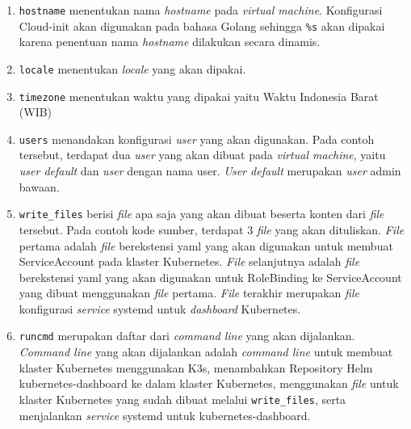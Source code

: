 \begin{enumerate}
  
  \item \lstinline{hostname} menentukan nama \emph{hostname} pada \emph{virtual machine}.
    Konfigurasi Cloud-init akan digunakan pada bahasa Golang sehingga \lstinline{%s}
    akan dipakai karena penentuan nama \emph{hostname} dilakukan secara dinamis.

  \item \lstinline{locale} menentukan \emph{locale} yang akan dipakai.

  \item \lstinline{timezone} menentukan waktu yang dipakai yaitu Waktu Indonesia Barat (WIB)

  \item \lstinline{users} menandakan konfigurasi \emph{user} yang akan digunakan. Pada
    contoh tersebut, terdapat dua \emph{user} yang akan dibuat pada \emph{virtual machine},
    yaitu \emph{user default} dan \emph{user} dengan nama user. \emph{User default} merupakan
    \emph{user} admin bawaan.

  \item \lstinline{write_files} berisi \emph{file} apa saja yang akan dibuat beserta konten
    dari \emph{file} tersebut. Pada contoh kode sumber, terdapat 3 \emph{file} yang akan dituliskan.
    \emph{File} pertama adalah \emph{file} berekstensi yaml yang akan digunakan untuk membuat
    ServiceAccount pada klaster Kubernetes. \emph{File} selanjutnya adalah \emph{file} berekstensi
    yaml yang akan digunakan untuk RoleBinding ke ServiceAccount yang dibuat menggunakan
    \emph{file} pertama. \emph{File} terakhir merupakan \emph{file} konfigurasi 
    \emph{service} systemd untuk \emph{dashboard} Kubernetes.

  \item \lstinline{runcmd} merupakan daftar dari \emph{command line} yang akan dijalankan.
    \emph{Command line} yang akan dijalankan adalah \emph{command line} untuk membuat klaster
    Kubernetes menggunakan K3s, menambahkan Repository Helm kubernetes-dashboard ke dalam
    klaster Kubernetes, menggunakan \emph{file} untuk klaster Kubernetes yang sudah dibuat
    melalui \lstinline{write_files}, serta menjalankan \emph{service} systemd untuk
    kubernetes-dashboard.

\end{enumerate}



